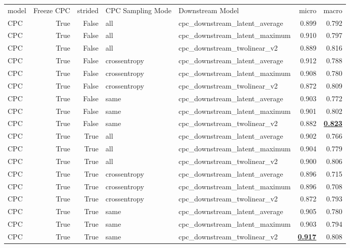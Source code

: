 \begin{adjustbox}{width=\textwidth}
\begin{tabular}{lrrllrr}
{model} & {Freeze CPC} & {strided} & {CPC Sampling Mode} & {Downstream Model} & {micro} & {macro} \\
CPC & True & False & all & cpc\_downstream\_latent\_average & 0.899 & 0.792 \\
CPC & True & False & all & cpc\_downstream\_latent\_maximum & 0.910 & 0.797 \\
CPC & True & False & all & cpc\_downstream\_twolinear\_v2 & 0.889 & 0.816 \\
CPC & True & False & crossentropy & cpc\_downstream\_latent\_average & 0.912 & 0.788 \\
CPC & True & False & crossentropy & cpc\_downstream\_latent\_maximum & 0.908 & 0.780 \\
CPC & True & False & crossentropy & cpc\_downstream\_twolinear\_v2 & 0.872 & 0.809 \\
CPC & True & False & same & cpc\_downstream\_latent\_average & 0.903 & 0.772 \\
CPC & True & False & same & cpc\_downstream\_latent\_maximum & 0.901 & 0.802 \\
CPC & True & False & same & cpc\_downstream\_twolinear\_v2 & 0.882 & \bfseries \underline{0.823} \\
CPC & True & True & all & cpc\_downstream\_latent\_average & 0.902 & 0.766 \\
CPC & True & True & all & cpc\_downstream\_latent\_maximum & 0.904 & 0.779 \\
CPC & True & True & all & cpc\_downstream\_twolinear\_v2 & 0.900 & 0.806 \\
CPC & True & True & crossentropy & cpc\_downstream\_latent\_average & 0.896 & 0.715 \\
CPC & True & True & crossentropy & cpc\_downstream\_latent\_maximum & 0.896 & 0.708 \\
CPC & True & True & crossentropy & cpc\_downstream\_twolinear\_v2 & 0.872 & 0.793 \\
CPC & True & True & same & cpc\_downstream\_latent\_average & 0.905 & 0.780 \\
CPC & True & True & same & cpc\_downstream\_latent\_maximum & 0.903 & 0.794 \\
CPC & True & True & same & cpc\_downstream\_twolinear\_v2 & \bfseries \underline{0.917} & 0.808 \\
\end{tabular}
\end{adjustbox}